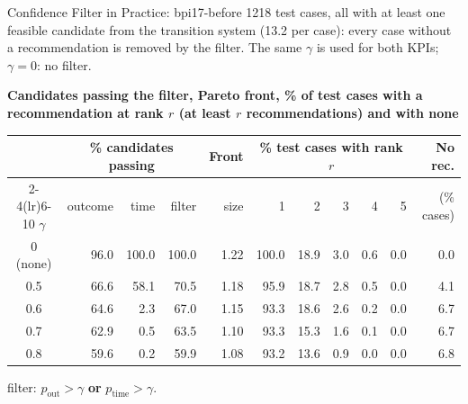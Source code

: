 \documentclass[aspectratio=169]{beamer} %
\begin{document}
\begin{frame}{Confidence Filter in Practice: bpi17-before}
  \small
  1218 test cases, \alert{all} with at least one feasible candidate from the transition system
  (13.2 per case): every case without a recommendation is removed by the filter. The same $\gamma$ is used for
  both KPIs; $\gamma = 0$: no filter.

  \textbf{Candidates passing the filter, Pareto front, \% of test cases with a recommendation at rank $r$ (at least $r$ recommendations) and with none}
  \begin{center}\setlength{\tabcolsep}{4pt}\setlength{\aboverulesep}{0pt}\setlength{\belowrulesep}{1pt}
  \begin{tabular}{crrrrrrrrrr}
    \toprule
     & \multicolumn{3}{c}{\% candidates passing} & Front & \multicolumn{5}{c}{\% test cases with rank $r$} & No rec. \\
    \cmidrule(lr){2-4}\cmidrule(lr){6-10}
    $\gamma$ & outcome & time & filter & size & 1 & 2 & 3 & 4 & 5 & (\% cases) \\
    \midrule
    0 (none) & 96.0  & 100.0 & 100.0 & 1.22 & 100.0 & 18.9 & 3.0 & 0.6 & 0.0 & 0.0 \\
    0.5      & 66.6  & 58.1  & 70.5  & 1.18 & 95.9  & 18.7 & 2.8 & 0.5 & 0.0 & 4.1 \\
    0.6      & 64.6  & 2.3   & 67.0  & 1.15 & 93.3  & 18.6 & 2.6 & 0.2 & 0.0 & 6.7 \\
    0.7      & 62.9  & 0.5   & 63.5  & 1.10 & 93.3  & 15.3 & 1.6 & 0.1 & 0.0 & 6.7 \\
    0.8      & 59.6  & 0.2   & 59.9  & 1.08 & 93.2  & 13.6 & 0.9 & 0.0 & 0.0 & 6.8 \\
    \bottomrule
  \end{tabular}
  \end{center}
  {\scriptsize filter: $p_{\text{out}} > \gamma$ \textbf{or} $p_{\text{time}} > \gamma$.}
\end{frame}
\end{document}

